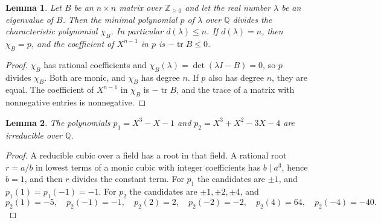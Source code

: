 \documentclass[11pt]{article}
\newtheorem{lemma}{Lemma}
\theoremstyle{remark}
\begin{document}
\begin{lemma}\label{deg}
Let $B$ be an $n\times n$ matrix over $\mathbb{Z}_{\ge 0}$ and let the
real number $\lambda$ be an eigenvalue of $B$. Then the minimal
polynomial $p$ of $\lambda$ over $\mathbb{Q}$ divides the characteristic
polynomial $\chi_B$. In particular $d(\lambda)\le n$. If
$d(\lambda)=n$, then $\chi_B=p$, and the coefficient of $X^{n-1}$ in $p$
is $-\operatorname{tr}B\le 0$.
\end{lemma}
\begin{proof}
$\chi_B$ has rational coefficients and $\chi_B(\lambda)=\det(\lambda
I-B)=0$, so $p$ divides $\chi_B$. Both are monic, and $\chi_B$ has
degree $n$. If $p$ also has degree $n$, they are equal. The coefficient
of $X^{n-1}$ in $\chi_B$ is $-\operatorname{tr}B$, and the trace of a
matrix with nonnegative entries is nonnegative.
\end{proof}

\begin{lemma}\label{irr}
The polynomials $p_1=X^3-X-1$ and $p_2=X^3+X^2-3X-4$ are irreducible
over $\mathbb{Q}$.
\end{lemma}
\begin{proof}
A reducible cubic over a field has a root in that field. A rational
root $r=a/b$ in lowest terms of a monic cubic with integer coefficients
has $b\mid a^3$, hence $b=1$, and then $r$ divides the constant term.
For $p_1$ the candidates are $\pm1$, and $p_1(1)=p_1(-1)=-1$. For $p_2$
the candidates are $\pm1,\pm2,\pm4$, and
\[
 p_2(1)=-5,\quad p_2(-1)=-1,\quad p_2(2)=2,\quad p_2(-2)=-2,\quad
 p_2(4)=64,\quad p_2(-4)=-40 .
\]
\end{proof}
\end{document}
